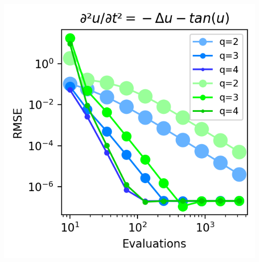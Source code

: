 \begin{center}
    \label{fig:wave medium}
    \includegraphics[width=\columnwidth]{../images/solver_wave and big tan.png}
    \label{fig:wave big}
\end{center}


\ifdefined\COMPILINGFROMMAIN
\else    
    
\fi